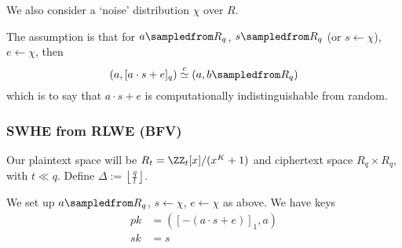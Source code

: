 We also consider a `noise' distribution $\chi$ over $R$.

The assumption is that for $a\sampledfrom R_q$, $s\sampledfrom R_q$ (or $s\leftarrow \chi$), $e\leftarrow \chi$, then
\[\left( a, [a\cdot s + e]_q \right) \overset{c}{\simeq} \left( a, b\sampledfrom R_q \right)\]
which is to say that $a\cdot s + e$ is computationally indistinguishable from random.

\subsubsection{SWHE from RLWE (BFV)}
Our plaintext space will be $R_t = \ZZ_t[x]/(x^K + 1)$ and ciphertext space $R_q\times R_q$, with $t\ll q$. Define $\Delta := \left\lfloor \frac{q}{t}\right\rfloor$.

We set up $a\sampledfrom R_q$, $s\leftarrow \chi$, $e\leftarrow \chi$ as above. We have keys
\begin{align*}
    pk & = \left( [-(a\cdot s + e)]_1, a \right) \\
    sk & = s
\end{align*}

